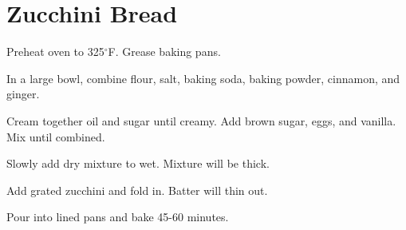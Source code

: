 \section{Zucchini Bread}
\begin{recipe}
	
	
	
	
	Preheat oven to 325$^{\circ}$F. Grease baking pans.
	
	In a large bowl, combine flour, salt, baking soda, baking powder, cinnamon, and ginger.
	
	Cream together oil and sugar until creamy. Add brown sugar, eggs, and vanilla. Mix until combined.
	
	Slowly add dry mixture to wet. Mixture will be thick.
	
	Add grated zucchini and fold in. Batter will thin out.
	
	Pour into lined pans and bake 45-60 minutes.
	
	
	
\end{recipe}
